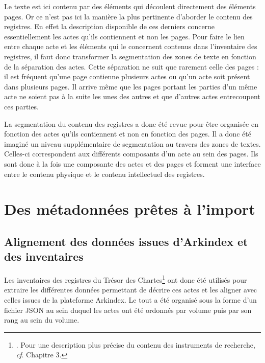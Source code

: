 \documentclass[a4paper,12pt,twoside]{book}
\begin{document}
	Le texte est ici contenu par des éléments qui découlent directement des éléments pages. Or ce n'est pas ici la manière la plus pertinente d'aborder le contenu des registres. En effet la description disponible de ces derniers concerne essentiellement les actes qu'ils contiennent et non les pages. Pour faire le lien entre chaque acte et les éléments qui le concernent contenus dans l'inventaire des registres, il faut donc transformer la segmentation des zones de texte en fonction de la séparation des actes. Cette séparation ne suit que rarement celle des pages : il est fréquent qu'une page contienne plusieurs actes ou qu'un acte soit présent dans plusieurs pages. Il arrive même que les pages portant les parties d'un même acte ne soient pas à la suite les unes des autres et que d'autres actes entrecoupent ces parties.
	
	La segmentation du contenu des registres a donc été revue pour être organisée en fonction des actes qu'ils contiennent et non en fonction des pages. Il a donc été imaginé un niveau supplémentaire de segmentation au travers des zones de textes. Celles-ci correspondent aux différents composants d'un acte au sein des pages. Ils sont donc à la fois une composante des actes et des pages et forment une interface entre le contenu physique et le contenu intellectuel des registres.
	
	\section{Des métadonnées prêtes à l’import}
	
	\subsection{Alignement des données issues d'Arkindex et des inventaires}
	
	Les inventaires des registres du Trésor des Chartes\footnote{\cite{glenisson_registres_1958}. Pour une description plus précise du contenu des instruments de recherche, \textit{cf}. Chapitre 3.} ont donc été utilisés pour extraire les différentes données permettant de décrire ces actes et les aligner avec celles issues de la plateforme Arkindex. Le tout a été organisé sous la forme d'un fichier JSON au sein duquel les actes ont été ordonnés par volume puis par son rang au sein du volume.
	
\end{document}

